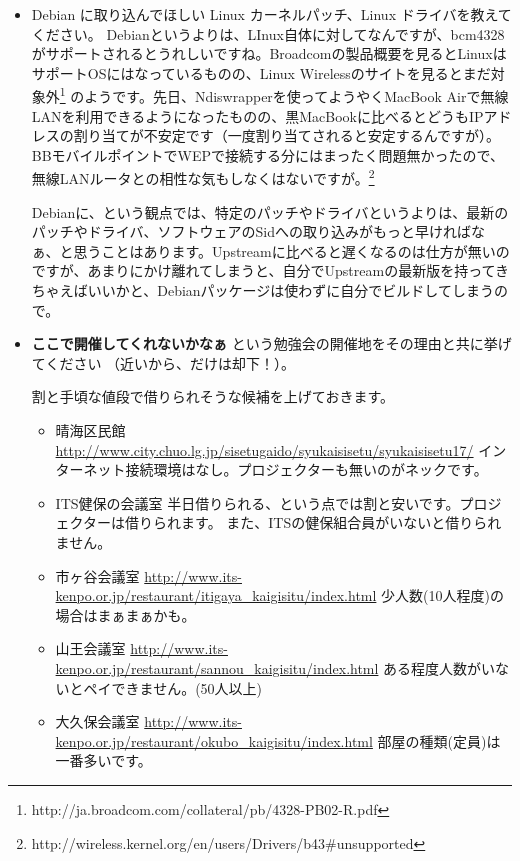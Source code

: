 \documentclass[mingoth,a4paper]{jsarticle}
\begin{document}
\begin{itemize}
\item Debian に取り込んでほしい Linux カーネルパッチ、Linux ドライバを教えてください。
Debianというよりは、LInux自体に対してなんですが、bcm4328がサポートされるとうれしいですね。Broadcomの製品概要を見るとLinuxはサポートOSにはなっているものの、Linux
Wirelessのサイトを見るとまだ対象外\footnote{http://ja.broadcom.com/collateral/pb/4328-PB02-R.pdf}
のようです。先日、Ndiswrapperを使ってようやくMacBook
Airで無線LANを利用できるようになったものの、黒MacBookに比べるとどうもIPアドレスの割り当てが不安定です（一度割り当てされると安定するんですが）。BBモバイルポイントでWEPで接続する分にはまったく問題無かったので、無線LANルータとの相性な気もしなくはないですが。\footnote{http://wireless.kernel.org/en/users/Drivers/b43\#unsupported}

Debianに、という観点では、特定のパッチやドライバというよりは、最新のパッチやドライバ、ソフトウェアのSidへの取り込みがもっと早ければなぁ、と思うことはあります。Upstreamに比べると遅くなるのは仕方が無いのですが、あまりにかけ離れてしまうと、自分でUpstreamの最新版を持ってきちゃえばいいかと、Debianパッケージは使わずに自分でビルドしてしまうので。

\item {\bf ここで開催してくれないかなぁ} という勉強会の開催地をその理由と共に挙げてください （近いから、だけは却下！）。

割と手頃な値段で借りられそうな候補を上げておきます。
\begin{itemize}
\item 晴海区民館
\url{http://www.city.chuo.lg.jp/sisetugaido/syukaisisetu/syukaisisetu17/}
インターネット接続環境はなし。プロジェクターも無いのがネックです。

\item ITS健保の会議室
半日借りられる、という点では割と安いです。プロジェクターは借りられます。
また、ITSの健保組合員がいないと借りられません。

\item 市ヶ谷会議室
\url{http://www.its-kenpo.or.jp/restaurant/itigaya_kaigisitu/index.html}
少人数(10人程度)の場合はまぁまぁかも。

\item 山王会議室
\url{http://www.its-kenpo.or.jp/restaurant/sannou_kaigisitu/index.html}
ある程度人数がいないとペイできません。(50人以上)

\item 大久保会議室
\url{http://www.its-kenpo.or.jp/restaurant/okubo_kaigisitu/index.html}
部屋の種類(定員)は一番多いです。

\end{itemize}
\end{itemize}
\end{document}
